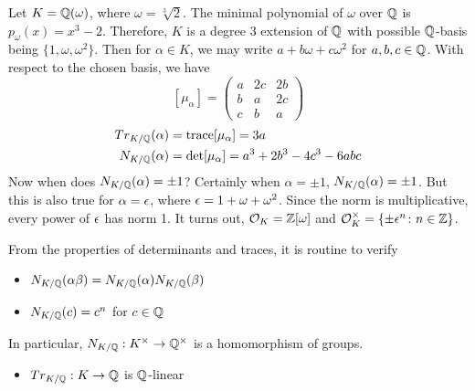 \begin{ex}
Let $K=\mathbb{Q}(\omega)$, where $\omega=\sqrt[3]{2}$. The minimal polynomial of $\omega$ over $\mathbb{Q}$ is $p_\omega(x)=x^3-2$. Therefore, $K$ is a degree 3 extension of $\mathbb{Q}$ with possible $\mathbb{Q}$-basis being $\{1,\omega,\omega^2\}$. Then for $\alpha \in K$, we may write $a+b\omega+c\omega^2$ for $a,b,c \in \mathbb{Q}$. With respect to the chosen basis, we have
	\[
	[\mu_\alpha]= \begin{pmatrix} a & 2c & 2b \\ b & a & 2c \\ c & b & a \end{pmatrix}
	\]
	\[
	\begin{split}
	Tr_{K/\mathbb{Q}}(\alpha)&=\operatorname{trace}[\mu_\alpha]=3a \\
	N_{K/\mathbb{Q}}(\alpha)&=\det[\mu_\alpha]=a^3+2b^3-4c^3-6abc
	\end{split}
	\]
Now when does $N_{K/\mathbb{Q}}(\alpha)=\pm1$? Certainly when $\alpha=\pm 1$, $N_{K/\mathbb{Q}}(\alpha)=\pm 1$. But this is also true for $\alpha=\epsilon$, where $\epsilon=1+\omega+\omega^2$. Since the norm is multiplicative, every power of $\epsilon$ has norm 1. It turns out, $\mathcal{O}_K=\mathbb{Z}[\omega]$ and $\mathcal{O}_K^\times=\{\pm \epsilon^n \colon n \in \mathbb{Z}\}$. \xqed
\end{ex}

From the properties of determinants and traces, it is routine to verify

\begin{prop} \hfill
	\begin{itemize}
	\item $N_{K/\mathbb{Q}}(\alpha\beta)=N_{K/\mathbb{Q}}(\alpha) N_{K/\mathbb{Q}}(\beta)$
	\item $N_{K/\mathbb{Q}}(c)=c^n$ for $c \in \mathbb{Q}$
	\end{itemize}
In particular, $N_{K/\mathbb{Q}}: K^\times \to \mathbb{Q}^\times$ is a homomorphism of groups.
	\begin{itemize}
	\item $Tr_{K/\mathbb{Q}}: K \to \mathbb{Q}$ is $\mathbb{Q}$-linear
	\end{itemize}
\end{prop}

